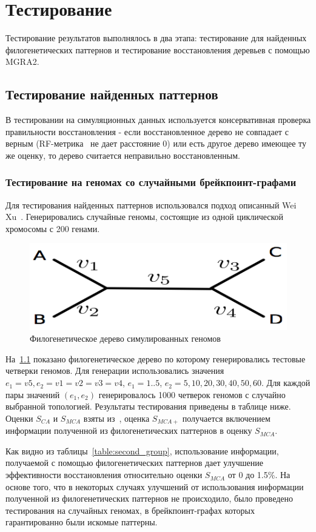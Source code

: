 \chapter{Тестирование}
Тестирование результатов выполнялось в два этапа: тестирование для найденных филогенетических паттернов и тестирование
восстановления деревьев с помощью MGRA2.

\section{Тестирование найденных паттернов}
В тестировании на симуляционных данных используется консервативная проверка правильности восстановления -
если восстановленное дерево не совпадает с верным (RF-метрика~\cite{Robinson1981} не дает расстояние 0) или
есть другое дерево имеющее ту же оценку, то дерево считается неправильно восстановленным.

\subsection{Тестирование на геномах со случайными брейкпоинт-графами}
Для тестирования найденных паттернов использовался подход описанный Wei Xu~\cite{xu2010exploring}.
Генерировались случайные геномы, состоящие из одной циклической хромосомы с 200 генами.
\begin{figure}[H]
  \includegraphics[max width=\textwidth]{fig/3/wei_xu_tree.png}
  \caption{Филогенетическое дерево симулированных геномов~\cite{xu2010exploring}}
  \label{fig:testing_phyl_tree}
\end{figure}
На~\ref{fig:testing_phyl_tree} показано филогенетическое дерево по которому генерировались тестовые четверки геномов.
Для генерации использовались значения $e_1 = v5, e_2 = v1 = v2 = v3 = v4$,
$e_1 = 1..5$, $e_2 = 5, 10, 20, 30, 40, 50, 60$.
Для каждой пары значений $(e_1, e_2)$ генерировалось 1000 четверок геномов с случайно выбранной топологией.
Результаты тестирования приведены в таблице ниже. Оценки $S_{CA}$ и $S_{MCA}$ взяты из~\cite{xu2010exploring},
оценка $S_{MCA+}$ получается включением информации полученной из филогенетических паттернов в оценку $S_{MCA}$.

Как видно из таблицы~\ref{table:second_group}, использование информации,
получаемой с помощью филогенетических паттернов дает улучшение эффективности восстановления относительно оценки $S_{MCA}$ от 0 до 1.5\%.
На основе того, что в некоторых случаях улучшений от использования информации полученной из филогенетических паттернов не происходило,
было проведено тестирования на случайных геномах, в брейкпоинт-графах которых гарантированно были искомые паттерны.

